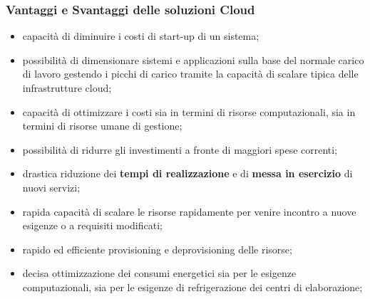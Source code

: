\subsubsection{Vantaggi e Svantaggi delle soluzioni Cloud}\label{sub:ftt_vantaggi_svantaggi_delle_soluzioni_cloud} %
\begin{note}
    \begin{itemize}
        \item capacità di diminuire i costi di start-up di un sistema;
        \item possibilità di dimensionare sistemi e applicazioni sulla base del normale carico di lavoro gestendo i picchi di carico tramite la capacità di scalare tipica delle infrastrutture cloud;
        \item capacità di ottimizzare i costi sia in termini di risorse computazionali, sia in termini di risorse umane di gestione;
        \item possibilità di ridurre gli investimenti a fronte di maggiori spese correnti;
    \end{itemize}
\end{note}
\begin{note}
    \begin{itemize}
        \item drastica riduzione dei \textbf{tempi di realizzazione} e di \textbf{messa in esercizio} di nuovi servizi;
        \item rapida capacità di scalare le risorse rapidamente per venire incontro a nuove esigenze o a requisiti modificati;
        \item rapido ed efficiente provisioning e deprovisioning delle risorse;
        \item decisa ottimizzazione dei consumi energetici sia per le esigenze computazionali, sia per le esigenze di refrigerazione dei centri di elaborazione;
    \end{itemize}
\end{note}
